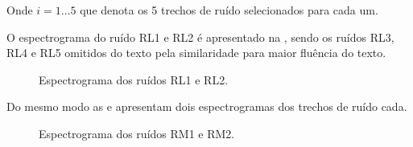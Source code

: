 Onde $i=1 \ldots 5$ que denota os 5 trechos de ruído selecionados para cada um.

O espectrograma do ruído RL1 e RL2  é apresentado na , sendo os ruídos RL3, RL4 e RL5 omitidos do texto pela similaridade para maior fluência do texto.


\begin{figure}[H]
\quad
\caption{Espectrograma dos ruídos RL1 e RL2.}
\label{SRL}
\end{figure}

Do mesmo modo as  e  apresentam dois espectrogramas dos trechos de ruído cada.


\begin{figure}[H]
\quad
 \caption{Espectrograma dos ruídos RM1 e RM2.}
\label{SRM}
\end{figure}

